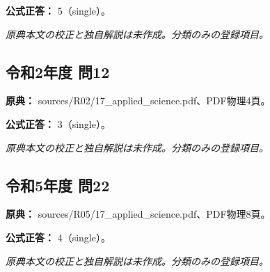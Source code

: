 \textbf{公式正答：} 5（single）。

\par\textit{原典本文の校正と独自解説は未作成。分類のみの登録項目。}

\subsection{令和2年度 問12}
\label{q:r02-reg-applied-12}

\noindent\textbf{原典：} sources/R02/17\_applied\_science.pdf、PDF物理4頁。

\textbf{公式正答：} 3（single）。

\par\textit{原典本文の校正と独自解説は未作成。分類のみの登録項目。}

\subsection{令和5年度 問22}
\label{q:r05-reg-applied-22}

\noindent\textbf{原典：} sources/R05/17\_applied\_science.pdf、PDF物理8頁。

\textbf{公式正答：} 4（single）。

\par\textit{原典本文の校正と独自解説は未作成。分類のみの登録項目。}
